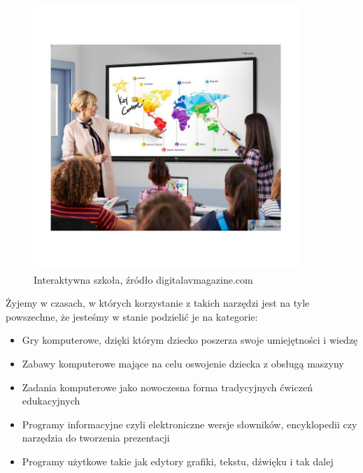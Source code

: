 \documentclass{article}
\begin{document}
	\begin{figure}
		\centering
		\includegraphics[width=10cm]{modern_school}
		\caption{Interaktywna szkoła, źródło digitalavmagazine.com}
	\end{figure}
	\par
	Żyjemy w czasach, w których korzystanie z takich narzędzi jest na tyle powszechne, że jesteśmy w stanie podzielić je na kategorie\cite{ref8}:
	\newline
	\begin{itemize}
		\item Gry komputerowe, dzięki którym dziecko poszerza swoje umiejętności i wiedzę
		\item Zabawy komputerowe mające na celu oswojenie dziecka z obsługą maszyny
		\item Zadania komputerowe jako nowoczesna forma tradycyjnych ćwiczeń edukacyjnych
		\item Programy informacyjne czyli elektroniczne wersje słowników, encyklopedii czy narzędzia do tworzenia prezentacji
		\item Programy użytkowe takie jak edytory grafiki, tekstu, dźwięku i tak dalej
	\end{itemize}
	\par
\end{document}
